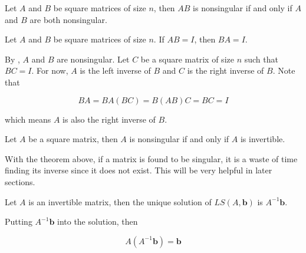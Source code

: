 \documentclass[a4paper,12pt]{article}
\begin{document}
\begin{thm}
  Let $A$ and $B$ be square matrices of size $n$, then $AB$ is nonsingular if and only if $A$ and $B$ are both nonsingular.
\end{thm}\n

\begin{thm}
  Let $A$ and $B$ be square matrices of size $n$. If $AB=I$, then $BA=I$.\n

  \prf By \rthm[\sctr{1}], $A$ and $B$ are nonsingular. Let $C$ be a square matrix of size $n$ such that $BC=I$. For now, $A$ is the left inverse of $B$ and $C$ is the right inverse of $B$. Note that

  $$BA=BA(BC)=B(AB)C=BC=I$$\s

  which means $A$ is also the right inverse of $B$.
\end{thm}\n

\begin{thm}
  Let $A$ be a square matrix, then $A$ is nonsingular if and only if $A$ is invertible.
\end{thm}\n

With the theorem above, if a matrix is found to be singular, it is a waste of time finding its inverse since it does not exist. This will be very helpful in later sections.\n

\begin{thm}
  Let $A$ is an invertible matrix, then the unique solution of $LS(A,\mathbf{b})$ is $A^{-1}\mathbf{b}$.\n

  \prf Putting $A^{-1}\mathbf{b}$ into the solution, then

  $$A(A^{-1}\mathbf{b})=\mathbf{b}$$
\end{thm}\n
\end{document}
